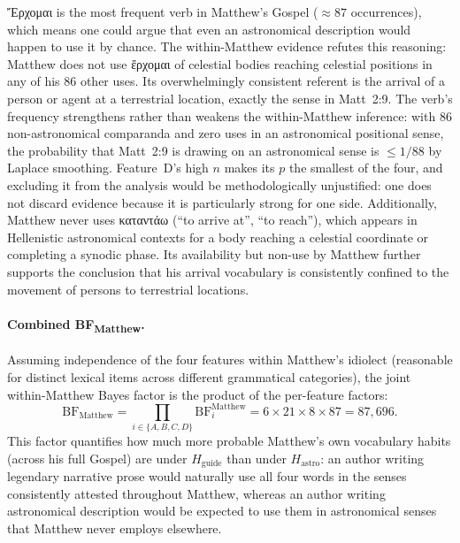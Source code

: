 \documentclass[11pt,a4paper]{article}
\newcommand{\grk}[1]{{\fontencoding{LGR}\selectfont #1}}
\newcommand{\grk}[1]{{\greekfont #1}}
\begin{document}
\grk{Ἔρχομαι} is the most frequent verb in Matthew's Gospel (${\approx}87$
occurrences), which means one could argue that even an astronomical description
would happen to use it by chance. The within-Matthew evidence refutes this
reasoning: Matthew does not use \grk{ἔρχομαι} of celestial bodies reaching
celestial positions in any of his 86 other uses. Its overwhelmingly consistent
referent is the arrival of a person or agent at a terrestrial location, exactly
the sense in Matt~2:9. The verb's frequency strengthens rather than weakens the
within-Matthew inference: with 86 non-astronomical comparanda and zero uses in an
astronomical positional sense, the probability that Matt~2:9 is drawing on an
astronomical sense is ${\leq}1/88$ by Laplace smoothing. Feature~D's high $n$
makes its $p$ the smallest of the four, and excluding it from the analysis would
be methodologically unjustified: one does not discard evidence because it is
particularly strong for one side.
Additionally, Matthew never uses \grk{καταντάω} (``to arrive at'', ``to reach''),
which appears in Hellenistic astronomical contexts for a body reaching a
celestial coordinate or completing a synodic phase.
Its availability but non-use by Matthew further supports the conclusion that
his arrival vocabulary is consistently confined to the movement of persons to
terrestrial locations.

\paragraph{Combined BF\textsubscript{Matthew}.}

Assuming independence of the four features within Matthew's idiolect (reasonable
for distinct lexical items across different grammatical categories), the joint
within-Matthew Bayes factor is the product of the per-feature factors:
\begin{equation}
  \mathrm{BF}_\text{Matthew}
    = \prod_{i \in \{A,B,C,D\}} \mathrm{BF}_i^\text{Matthew}
    = 6 \times 21 \times 8 \times 87
    = 87{,}696.
  \label{eq:bf_matthew}
\end{equation}
This factor quantifies how much more probable Matthew's own vocabulary habits
(across his full Gospel) are under $H_\text{guide}$ than under $H_\text{astro}$:
an author writing legendary narrative prose would naturally use all four words in
the senses consistently attested throughout Matthew, whereas an author writing
astronomical description would be expected to use them in astronomical senses that
Matthew never employs elsewhere.
\end{document}
